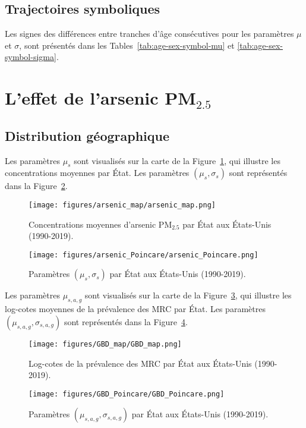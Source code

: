 \subsection{Trajectoires symboliques}
Les signes des différences entre tranches d'âge consécutives pour les paramètres $\mu$ et $\sigma$, sont présentés dans les Tables~\ref{tab:age-sex-symbol-mu} et \ref{tab:age-sex-symbol-sigma}.

\begin{table}[H]
	\centering
	
	\label{tab:age-sex-symbol-mu}
\end{table}

\begin{table}[H]
	\centering
	
	\label{tab:age-sex-symbol-sigma}
\end{table}


\section{L'effet de l'arsenic PM\(_{2.5}\)}

\subsection{Distribution géographique}
Les paramètres \(\mu_s\) sont visualisés sur la carte de la Figure~\ref{fig:arsenic-map}, qui illustre les concentrations moyennes par État. Les paramètres \((\mu_s, \sigma_s)\) sont représentés dans la Figure~\ref{fig:arsenic_Poincare}.
\begin{figure}[H]
	\centering
	\texttt{[image: figures/arsenic\_map/arsenic\_map.png]}
	\caption{Concentrations moyennes d'arsenic PM\(_{2.5}\) par État aux États-Unis (1990-2019).}
	\label{fig:arsenic-map}
\end{figure}
\begin{figure}[H]
	\centering
	\texttt{[image: figures/arsenic\_Poincare/arsenic\_Poincare.png]}
	\caption{Paramètres \((\mu_s, \sigma_s)\) par État aux États-Unis (1990-2019).}
	\label{fig:arsenic_Poincare}
\end{figure}
Les paramètres \(\mu_{s,a,g}\) sont visualisés sur la carte de la Figure~\ref{fig:GBD-map}, qui illustre les log-cotes moyennes de la prévalence des MRC par État. Les paramètres \((\mu_{s,a,g}, \sigma_{s,a,g})\) sont représentés dans la Figure~\ref{fig:GBD_Poincare}.
\begin{figure}[H]
	\centering
	\texttt{[image: figures/GBD\_map/GBD\_map.png]}
	\caption{Log-cotes de la prévalence des MRC par État aux États-Unis (1990-2019).}
	\label{fig:GBD-map}
\end{figure}
\begin{figure}[H]
	\centering
	\texttt{[image: figures/GBD\_Poincare/GBD\_Poincare.png]}
	\caption{Paramètres \((\mu_{s,a,g}, \sigma_{s,a,g})\) par État aux États-Unis (1990-2019).}
	\label{fig:GBD_Poincare}
\end{figure}


